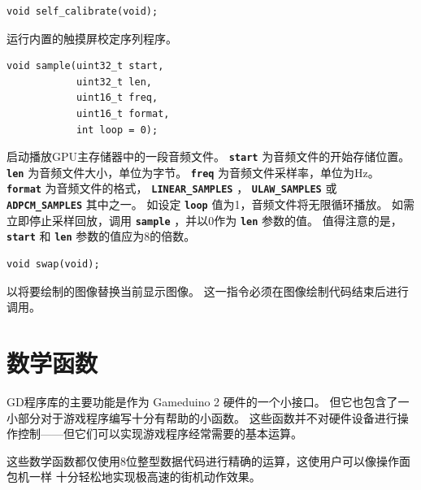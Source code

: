 \documentclass[10pt]{book}
\newcommand{\gdtwo}{Gameduino 2 }
\newcommand{\mach}[1]{\texttt{\textbf{#1}}}
\begin{document}
\begin{CJK}{UTF8}{gkai}

\begin{framed}
\begin{verbatim}
void self_calibrate(void);
\end{verbatim}
\end{framed}

运行内置的触摸屏校定序列程序。


\begin{framed}
\begin{verbatim}
void sample(uint32_t start,
            uint32_t len,
            uint16_t freq,
            uint16_t format,
            int loop = 0);
\end{verbatim}
\end{framed}

启动播放GPU主存储器中的一段音频文件。
\mach{start} 为音频文件的开始存储位置。
\mach{len} 为音频文件大小，单位为字节。
\mach{freq} 为音频文件采样率，单位为Hz。
\mach{format} 为音频文件的格式，
\mach{LINEAR\_SAMPLES} ，
\mach{ULAW\_SAMPLES} 或
\mach{ADPCM\_SAMPLES} 其中之一。
如设定 \mach{loop} 值为1，音频文件将无限循环播放。
如需立即停止采样回放，调用 \mach{sample} ，并以0作为 \mach{len} 参数的值。
值得注意的是， \mach{start} 和 \mach{len} 参数的值应为8的倍数。


\begin{framed}
\begin{verbatim}
void swap(void);
\end{verbatim}
\end{framed}

以将要绘制的图像替换当前显示图像。
这一指令必须在图像绘制代码结束后进行调用。

\chapter{数学函数}

GD程序库的主要功能是作为 \gdtwo 硬件的一个小接口。
但它也包含了一小部分对于游戏程序编写十分有帮助的小函数。
这些函数并不对硬件设备进行操作控制——但它们可以实现游戏程序经常需要的基本运算。

这些数学函数都仅使用8位整型数据代码进行精确的运算，这使用户可以像操作面包机一样
十分轻松地实现极高速的街机动作效果。



\end{CJK}
\end{document}
